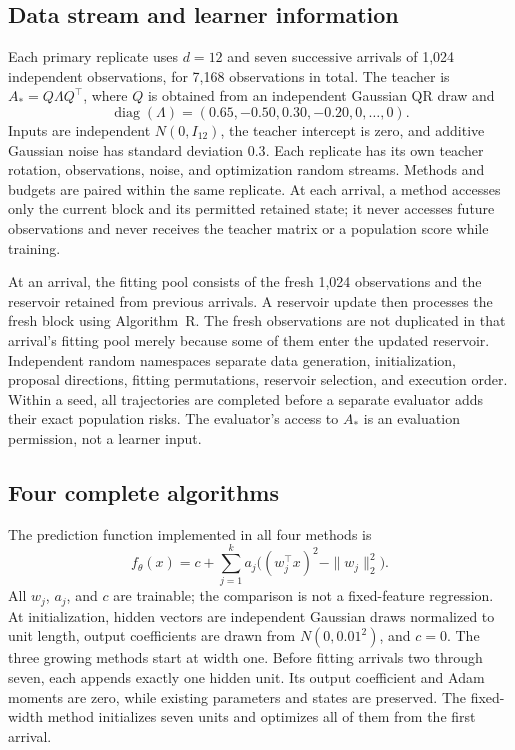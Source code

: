 \documentclass[10pt]{article}
\begin{document}
\subsection{Data stream and learner information}

Each primary replicate uses $d=12$ and seven successive arrivals of
1,024 independent observations, for 7,168 observations in total.
The teacher is $A_*=Q\Lambda Q^\top$, where $Q$ is obtained from an
independent Gaussian QR draw and
\[
\operatorname{diag}(\Lambda)
=(0.65,-0.50,0.30,-0.20,0,\ldots,0).
\]
Inputs are independent $N(0,I_{12})$, the teacher intercept is zero,
and additive Gaussian noise has standard deviation $0.3$. Each
replicate has its own teacher rotation, observations, noise, and
optimization random streams. Methods and budgets are paired within
the same replicate. At each arrival, a method accesses only the current
block and its permitted retained state; it never accesses future
observations and never receives the teacher matrix or a population
score while training.

At an arrival, the fitting pool consists of the fresh 1,024 observations
and the reservoir retained from previous arrivals. A reservoir update
then processes the fresh block using Algorithm~R. The fresh observations
are not duplicated in that arrival's fitting pool merely because some
of them enter the updated reservoir. Independent random namespaces
separate data generation, initialization, proposal directions, fitting
permutations, reservoir selection, and execution order. Within a seed,
all trajectories are completed before a separate evaluator adds their
exact population risks. The evaluator's access to $A_*$ is an
evaluation permission, not a learner input.

\subsection{Four complete algorithms}

The prediction function implemented in all four methods is
\begin{equation}
 f_\theta(x)=c+\sum_{j=1}^k a_j\bigl((w_j^\top x)^2-\|w_j\|_2^2\bigr).
 \label{eq:factor-predictor}
\end{equation}
All $w_j$, $a_j$, and $c$ are trainable; the comparison is not a
fixed-feature regression. At initialization, hidden vectors are
independent Gaussian draws normalized to unit length, output
coefficients are drawn from $N(0,0.01^2)$, and $c=0$.
The three growing methods start at width one. Before fitting arrivals
two through seven, each appends exactly one hidden unit. Its output
coefficient and Adam moments are zero, while existing parameters and
states are preserved. The fixed-width method initializes seven units
and optimizes all of them from the first arrival.
\end{document}
